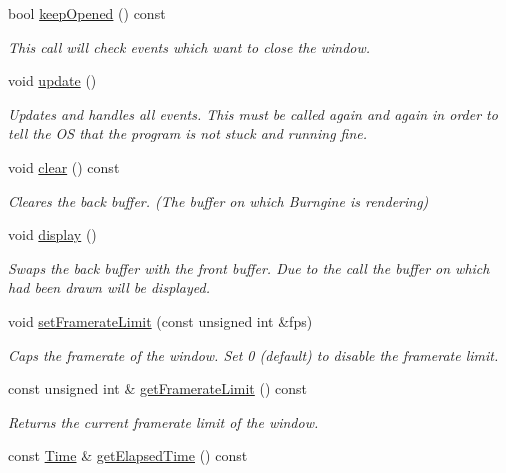 \begin{DoxyCompactItemize}
bool \hyperlink{classburn_1_1_window_aefd7af7009fee4982b04ac946540f7ee}{keep\-Opened} () const 
\begin{DoxyCompactList}\small\item\em This call will check events which want to close the window. \end{DoxyCompactList}\item 
void \hyperlink{classburn_1_1_window_a81e1da9f111938b38bc4c2c06dac9cfd}{update} ()
\begin{DoxyCompactList}\small\item\em Updates and handles all events. This must be called again and again in order to tell the O\-S that the program is not stuck and running fine. \end{DoxyCompactList}\item 
void \hyperlink{classburn_1_1_window_a2e6c75cedaeb5571aaac2921bf8bcb6e}{clear} () const 
\begin{DoxyCompactList}\small\item\em Cleares the back buffer. (The buffer on which Burngine is rendering) \end{DoxyCompactList}\item 
void \hyperlink{classburn_1_1_window_a017ddbce346ebe3e11e2abc6ce0948e0}{display} ()
\begin{DoxyCompactList}\small\item\em Swaps the back buffer with the front buffer. Due to the call the buffer on which had been drawn will be displayed. \end{DoxyCompactList}\item 
void \hyperlink{classburn_1_1_window_a840d45e13910496fe9edd45d844e46a1}{set\-Framerate\-Limit} (const unsigned int \&fps)
\begin{DoxyCompactList}\small\item\em Caps the framerate of the window. Set 0 (default) to disable the framerate limit. \end{DoxyCompactList}\item 
const unsigned int \& \hyperlink{classburn_1_1_window_a95bf30cd3d9eb1f85a9777e177d50c97}{get\-Framerate\-Limit} () const 
\begin{DoxyCompactList}\small\item\em Returns the current framerate limit of the window. \end{DoxyCompactList}\item 
const \hyperlink{classburn_1_1_time}{Time} \& \hyperlink{classburn_1_1_window_a864f6379667a26b29129fcb0e75006d3}{get\-Elapsed\-Time} () const 

\end{DoxyCompactItemize}
